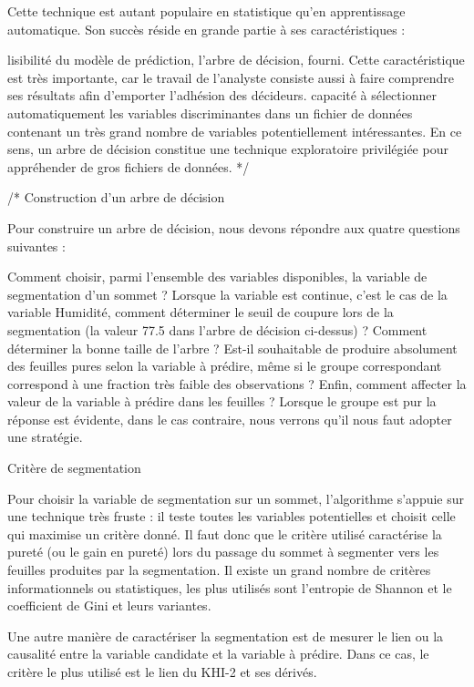 Cette technique est autant populaire en statistique qu’en apprentissage automatique. Son succès réside en grande partie à ses caractéristiques :

    lisibilité du modèle de prédiction, l’arbre de décision, fourni. Cette caractéristique est très importante, car le travail de l'analyste consiste aussi à faire comprendre ses résultats afin d’emporter l’adhésion des décideurs.
    capacité à sélectionner automatiquement les variables discriminantes dans un fichier de données contenant un très grand nombre de variables potentiellement intéressantes. En ce sens, un arbre de décision constitue une technique exploratoire privilégiée pour appréhender de gros fichiers de données.
*/


/*  Construction d'un arbre de décision

Pour construire un arbre de décision, nous devons répondre aux quatre questions suivantes :

    Comment choisir, parmi l’ensemble des variables disponibles, la variable de segmentation d’un sommet ?
    Lorsque la variable est continue, c’est le cas de la variable Humidité, comment déterminer le seuil de coupure lors de la segmentation (la valeur 77.5 dans l’arbre de décision ci-dessus) ?
    Comment déterminer la bonne taille de l’arbre ? Est-il souhaitable de produire absolument des feuilles pures selon la variable à prédire, même si le groupe correspondant correspond à une fraction très faible des observations ?
    Enfin, comment affecter la valeur de la variable à prédire dans les feuilles ? Lorsque le groupe est pur la réponse est évidente, dans le cas contraire, nous verrons qu'il nous faut adopter une stratégie.

Critère de segmentation

Pour choisir la variable de segmentation sur un sommet, l’algorithme s’appuie sur une technique très fruste : il teste toutes les variables potentielles et choisit celle qui maximise un critère donné. Il faut donc que le critère utilisé caractérise la pureté (ou le gain en pureté) lors du passage du sommet à segmenter vers les feuilles produites par la segmentation. Il existe un grand nombre de critères informationnels ou statistiques, les plus utilisés sont l’entropie de Shannon et le coefficient de Gini et leurs variantes.

Une autre manière de caractériser la segmentation est de mesurer le lien ou la causalité entre la variable candidate et la variable à prédire. Dans ce cas, le critère le plus utilisé est le lien du KHI-2 et ses dérivés.

